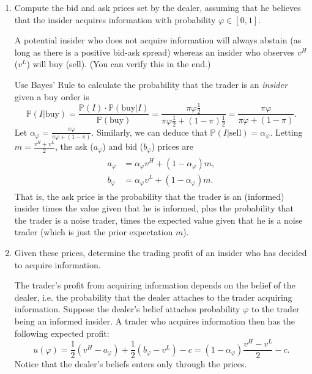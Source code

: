 \documentclass[11pt
, answers
]{exam}
\begin{document}
\begin{enumerate} [label=(\alph*). ]

\item Compute the bid and ask prices set by the dealer, assuming that he believes that the insider acquires information with probability $\varphi \in [0,1]$.

\begin{solution}
	A potential insider who does not acquire information will always abstain (as long as there is a positive bid-ask spread) whereas an insider who observes $v^H$ ($v^L$) will buy (sell). (You can verify this in the end.)
	
	Use Bayes' Rule to calculate the probability that the trader is an \textit{insider} given a buy order is
	\[
	\mathbb{P}(I|\text{buy}) = \frac{\mathbb{P}(I) \cdot \mathbb{P}(\text{buy}|I)}{\mathbb{P}(\text{buy})} =\frac{\pi \varphi \frac{1}{2}}{\pi \varphi \frac{1}{2} + (1-\pi)\frac{1}{2}} = \frac{\pi \varphi }{\pi \varphi  + (1-\pi)}.
	\]
	Let $\alpha_\varphi = \frac{\pi \varphi }{\pi \varphi  + (1-\pi)}$. Similarly, we can deduce that $\mathbb{P}(I|\text{sell})=\alpha_\varphi$. Letting $m=\frac{v^H+v^L}{2}$, the ask ($a_\varphi$) and bid ($b_\varphi$) prices are
	\begin{gather}
		\begin{aligned}
		a_\varphi & = \alpha_\varphi v^H+(1-\alpha_\varphi) m, \\
		b_\varphi & = \alpha_\varphi v^L+(1-\alpha_\varphi) m.
		\end{aligned}
		\label{eq:bidask}
	\end{gather}
	That is, the ask price is the probability that the trader is an (informed) insider times the value given that he is informed, plus the probability that the trader is a noise trader, times the expected value  given that he is a noise trader (which is just the prior expectation $m$).
\end{solution}


\item Given these prices, determine the trading profit of an insider who has decided to acquire information.

\begin{solution}
	The trader's profit from acquiring information depends on the belief of the dealer, i.e. the probability that the dealer attaches to the trader acquiring information. Suppose the dealer's belief attaches probability $\varphi$ to the trader being an informed insider. A trader who acquires information then has the following expected profit:
	\[
	u(\varphi) = \frac{1}{2}(v^H - a_\varphi) + \frac{1}{2}(b_\varphi - v^L) - c = (1-\alpha_\varphi) \frac{v^H-v^L}{2}-c.
	\]
	Notice that the dealer's beliefs enters only through the prices.
\end{solution}



\end{enumerate}
\end{document}
